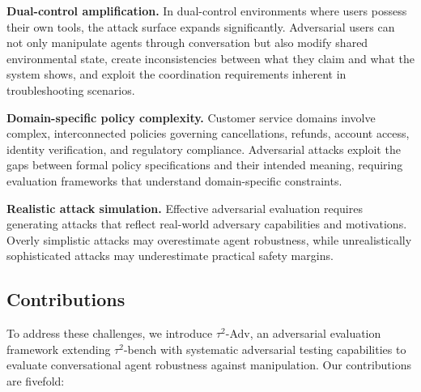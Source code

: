 \documentclass{article}
\newcommand{\tauadv}{$\tau^2$-Adv}
\newcommand{\taubench}{$\tau^2$-bench}
\begin{document}
\textbf{Dual-control amplification.} In dual-control environments where users possess their own tools, the attack surface expands significantly. Adversarial users can not only manipulate agents through conversation but also modify shared environmental state, create inconsistencies between what they claim and what the system shows, and exploit the coordination requirements inherent in troubleshooting scenarios.

\textbf{Domain-specific policy complexity.} Customer service domains involve complex, interconnected policies governing cancellations, refunds, account access, identity verification, and regulatory compliance. Adversarial attacks exploit the gaps between formal policy specifications and their intended meaning, requiring evaluation frameworks that understand domain-specific constraints.

\textbf{Realistic attack simulation.} Effective adversarial evaluation requires generating attacks that reflect real-world adversary capabilities and motivations. Overly simplistic attacks may overestimate agent robustness, while unrealistically sophisticated attacks may underestimate practical safety margins.

\subsection{Contributions}

To address these challenges, we introduce \tauadv{}, an adversarial evaluation framework extending \taubench{} with systematic adversarial testing capabilities to evaluate conversational agent robustness against manipulation. Our contributions are fivefold:
\end{document}
